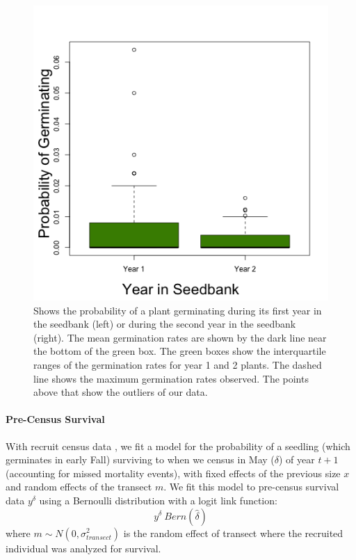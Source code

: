 \documentclass[11pt]{article}
\begin{document}
\begin{figure}
	\includegraphics[width=0.91\linewidth]{Figures/germination.png}
	\caption{Shows the probability of a plant germinating during its first year in the seedbank (left) or during the second year in the seedbank (right). The mean germination rates are shown by the dark line near the bottom of the green box. The green boxes show the interquartile ranges of the germination rates for year 1 and 2 plants. The dashed line shows the maximum germination rates observed. The points above that show the outliers of our data. }
	\label{app:AppA_Germ}
\end{figure}

\paragraph{Pre-Census Survival}
With recruit census data \cite{Miller2006}, we fit a model for the probability of a seedling (which germinates in early Fall) surviving to when we census in May ($\delta$) of year $t+1$ (accounting for missed mortality events), with fixed effects of the previous size $x$ and random effects of the transect $m$.
We fit this model to pre-census survival data $y^{\delta}$ using a Bernoulli distribution with a logit link function: 
$$y^{\delta} ~ Bern(\hat{\delta})$$
where $m \sim N(0, \sigma_{transect}^2)$ is the random effect of transect where the recruited individual was analyzed for survival.
\end{document}
